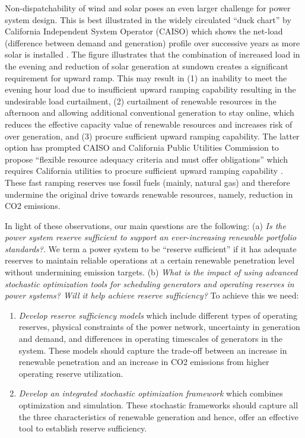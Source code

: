 \documentclass[11pt,a4paper]{article}
\newcommand{\gap}{\vspace{5pt}}
\begin{document}
Non-dispatchability of wind and solar poses an even larger challenge for power system design. This is best illustrated in the widely circulated ``duck chart'' by California Independent System Operator (CAISO) which shows the net-load (difference between demand and generation) profile over successive years as more solar is installed \cite{Duck16}. The figure illustrates that the combination of increased load in the evening and reduction of solar generation at sundown creates a significant requirement for upward ramp. This may result in (1) an inability to meet the evening hour load due to insufficient upward ramping capability resulting in the undesirable load curtailment, (2) curtailment of renewable resources in the afternoon and allowing additional conventional generation to stay online, which reduces the effective capacity value of renewable resources and increases risk of over generation, and (3) procure sufficient upward ramping capability. The latter option has prompted CAISO and California Public Utilities Commission to propose ``flexible resource adequacy criteria and must offer obligations'' which requires California utilities to procure sufficient upward ramping capability \cite{FracMoo16}. These fast ramping reserves use fossil fuels (mainly, natural gas) and therefore undermine the original drive towards renewable resources, namely, reduction in CO2 emissions.

\gap

In light of these observations, our main questions are the following: (a) \textit{Is the power system reserve sufficient to support an ever-increasing renewable portfolio standards?}. We term a power system to be ``reserve sufficient'' if it has adequate reserves to maintain reliable operations at a certain renewable penetration level without undermining emission targets. (b) \textit{What is the impact of using advanced stochastic optimization tools for scheduling generators and operating reserves in power systems? Will it help achieve reserve sufficiency?} To achieve this we need:
\begin{enumerate} \itemsep0em
	\item {\it Develop reserve sufficiency models} which include different types of operating reserves, physical constraints of the power network, uncertainty in generation and demand, and differences in operating timescales of generators in the system. These models should capture the trade-off between an increase in renewable penetration and an increase in CO2 emissions from higher operating reserve utilization.
	\item {\it Develop an integrated stochastic optimization framework} which combines optimization and simulation. These stochastic frameworks should capture all the three characteristics of renewable generation and hence, offer an effective tool to establish reserve sufficiency.
\end{enumerate}
\end{document}
